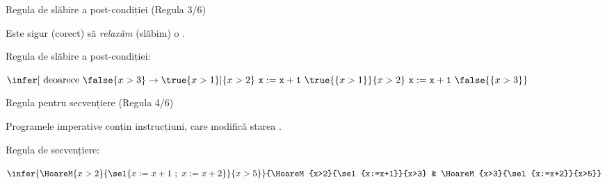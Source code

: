 \begin{frame}{Regula de slăbire a post-condiției (Regula 3/6)}

Este sigur (corect) să {\em relaxăm} (\alert{slăbim}) o .

\alert{Regula de slăbire a post-condiției:}
\begin{center}
\end{center}

\begin{example}
\begin{center}
$\infer[\mbox{ deoarece }\false{x>3} \to \true{x>1}]{\{x>2\}\ \mathtt{x := x+1}\ \true{\{x>1\}}}{{\{x>2\}}\ \mathtt{x := x+1}\ \false{\{x>3\}}}$
\end{center}

\end{example}
\end{frame}

\begin{frame}{Regula pentru secvențiere (Regula 4/6)}

Programele imperative conțin instrucțiuni, care modifică starea .

\alert{Regula de secvențiere:}
\begin{center}
\end{center}

\pause
\begin{example}
\begin{center}
$\infer{\HoareM{x>2}{\sel{x:=x+1\ ;\  x:=x+2}}{x>5}}{\HoareM{x>2}{\sel{x:=x+1}}{x>3} & \HoareM{x>3}{\sel{x:=x+2}}{x>5}}$
\end{center}

\end{example}
\end{frame}


